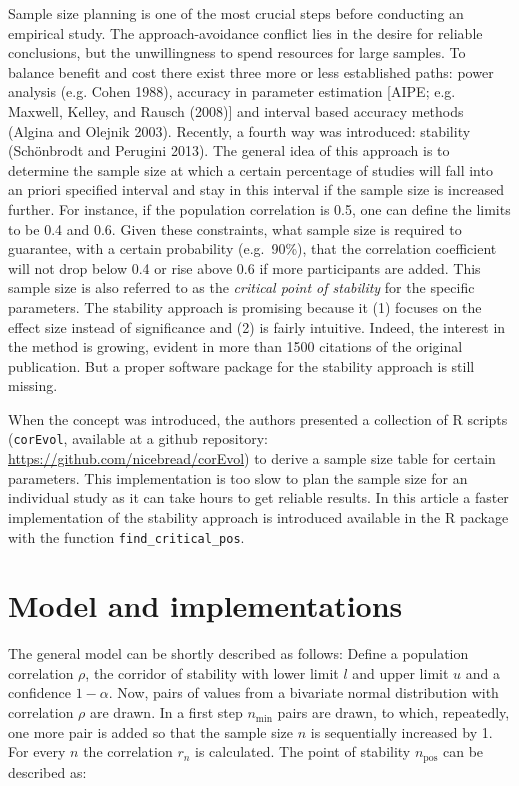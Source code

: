 Sample size planning is one of the most crucial steps before conducting an empirical study. The approach-avoidance conflict lies in the desire for reliable conclusions, but the unwillingness to spend resources for large samples. To balance benefit and cost there exist three more or less established paths: power analysis (e.g. Cohen 1988), accuracy in parameter estimation {[}AIPE; e.g. Maxwell, Kelley, and Rausch (2008){]} and interval based accuracy methods (Algina and Olejnik 2003). Recently, a fourth way was introduced: stability (Schönbrodt and Perugini 2013). The general idea of this approach is to determine the sample size at which a certain percentage of studies will fall into an priori specified interval and stay in this interval if the sample size is increased further. For instance, if the population correlation is 0.5, one can define the limits to be 0.4 and 0.6. Given these constraints, what sample size is required to guarantee, with a certain probability (e.g.~90\%), that the correlation coefficient will not drop below 0.4 or rise above 0.6 if more participants are added. This sample size is also referred to as the \emph{critical point of stability} for the specific parameters. The stability approach is promising because it (1) focuses on the effect size instead of significance and (2) is fairly intuitive. Indeed, the interest in the method is growing, evident in more than 1500 citations of the original publication. But a proper software package for the stability approach is still missing.

When the concept was introduced, the authors presented a collection of R scripts (\texttt{corEvol}, available at a github repository: \url{https://github.com/nicebread/corEvol}) to derive a sample size table for certain parameters. This implementation is too slow to plan the sample size for an individual study as it can take hours to get reliable results. In this article a faster implementation of the stability approach is introduced available in the R package  with the function \texttt{find\_critical\_pos}.

\hypertarget{model-and-implementations}{%
\section{Model and implementations}\label{model-and-implementations}}

The general model can be shortly described as follows: Define a population correlation \(\rho\), the corridor of stability with lower limit \(l\) and upper limit \(u\) and a confidence \(1-\alpha\). Now, pairs of values from a bivariate normal distribution with correlation \(\rho\) are drawn. In a first step \(n_\mathrm{min}\) pairs are drawn, to which, repeatedly, one more pair is added so that the sample size \(n\) is sequentially increased by 1. For every \(n\) the correlation \(r_n\) is calculated. The point of stability \(n_\mathrm{pos}\) can be described as:

